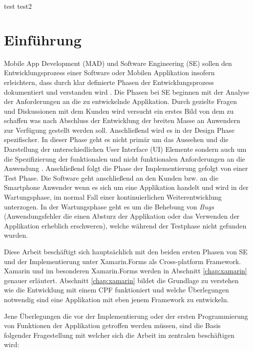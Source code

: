 %
%
% 
% 

test
test2
\chapter{Einführung}
\label{chap:intro}
	Mobile App Development (MAD) und Software Engineering (SE) sollen den Entwicklungsprozess einer Software oder Mobilen Applikation insofern erleichtern, dass durch klar definierte Phasen der Entwicklungsprozess dokumentiert und verstanden wird \cite{Anthony2010}. Die Phasen bei SE beginnen mit der Analyse der Anforderungen an die zu entwickelnde Applikation. Durch gezielte Fragen und Diskussionen mit dem Kunden wird versucht ein erstes Bild von dem zu schaffen was nach Abschluss der Entwicklung der breiten Masse an Anwendern zur Verfügung gestellt werden soll. Anschließend wird es in der Design Phase spezifischer. In dieser Phase geht es nicht primär um das Aussehen und die Darstellung der unterschiedlichen User Interface (UI) Elemente sondern auch um die Spezifizierung der funktionalen und nicht funktionalen Anforderungen an die Anwendung \cite{Anthony2010}. Anschließend folgt die Phase der Implementierung gefolgt von einer Test Phase. Die Software geht anschließend an den Kunden bzw. an die Smartphone Anwender wenn es sich um eine Applikation handelt und wird in der Wartungsphase, im normal Fall einer kontinuierlichen Weiterentwicklung unterzogen. In der Wartungsphase geht es um die Behebung von \textit{Bugs} (Anwendungsfehler die einen Absturz der Applikation oder das Verwenden der Applikation erheblich erschweren), welche während der Testphase nicht gefunden wurden. 

	Diese Arbeit beschäftigt sich hauptsächlich mit den beiden ersten Phasen von SE und der Implementierung unter Xamarin.Forms als Cross-platform Framework. Xamarin und im besonderen Xamarin.Forms werden in Abschnitt \ref{chap:xamarin} genauer erläutert. Abschnitt \ref{chap:xamarin} bildet die Grundlage zu verstehen wie die Entwicklung mit einem CPF funktioniert und welche Überlegungen notwendig sind eine Applikation mit eben jenem Framework zu entwickeln.

	Jene Überlegungen die vor der Implementierung oder der ersten Programmierung von Funktionen der Applikation getroffen werden müssen, sind die Basis folgender Fragestellung mit welcher sich die Arbeit im zentralen beschäftigen wird:\vspace{1cm}

